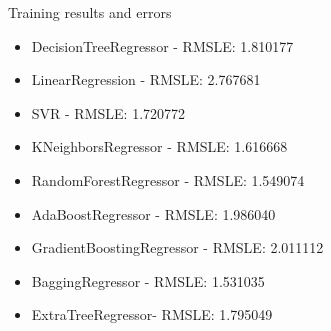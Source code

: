 \documentclass[
 size=12pt,
 paper=smartboard, %
 mode=present, %
 display=slides, %
style=tuliplab,
pauseslide,
fleqn,leqno]{powerdot}
\begin{document}
\begin{slide}[toc=,bm=]{ Training results and errors}
\begin{itemize}
 
  \item DecisionTreeRegressor - RMSLE: 1.810177
  \item LinearRegression - RMSLE: 2.767681
  \item SVR - RMSLE: 1.720772
  \item KNeighborsRegressor - RMSLE: 1.616668
  \item RandomForestRegressor - RMSLE: 1.549074
  \item AdaBoostRegressor - RMSLE: 1.986040
  \item GradientBoostingRegressor - RMSLE: 2.011112
  \item BaggingRegressor - RMSLE: 1.531035
  \item ExtraTreeRegressor- RMSLE: 1.795049
  
  
\end{itemize}
\end{slide}


\end{document}
